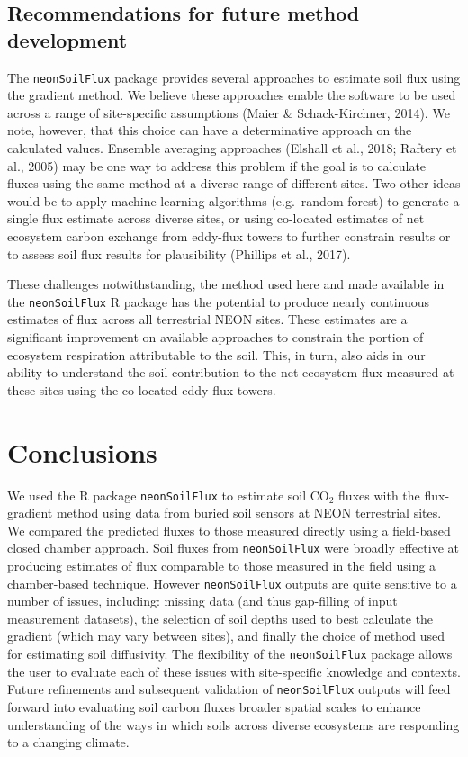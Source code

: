 \documentclass[
  letterpaper,
  DIV=11,
  numbers=noendperiod]{scrartcl}
\begin{document}
\subsection{Recommendations for future method
development}\label{recommendations-for-future-method-development}

The \texttt{neonSoilFlux} package provides several approaches to
estimate soil flux using the gradient method. We believe these
approaches enable the software to be used across a range of
site-specific assumptions (Maier \& Schack-Kirchner, 2014). We note,
however, that this choice can have a determinative approach on the
calculated values. Ensemble averaging approaches (Elshall et al., 2018;
Raftery et al., 2005) may be one way to address this problem if the goal
is to calculate fluxes using the same method at a diverse range of
different sites. Two other ideas would be to apply machine learning
algorithms (e.g.~random forest) to generate a single flux estimate
across diverse sites, or using co-located estimates of net ecosystem
carbon exchange from eddy-flux towers to further constrain results or to
assess soil flux results for plausibility (Phillips et al., 2017).

These challenges notwithstanding, the method used here and made
available in the \texttt{neonSoilFlux} R package has the potential to
produce nearly continuous estimates of flux across all terrestrial NEON
sites. These estimates are a significant improvement on available
approaches to constrain the portion of ecosystem respiration
attributable to the soil. This, in turn, also aids in our ability to
understand the soil contribution to the net ecosystem flux measured at
these sites using the co-located eddy flux towers.

\section{Conclusions}\label{conclusions}

We used the R package \texttt{neonSoilFlux} to estimate soil CO\(_2\)
fluxes with the flux-gradient method using data from buried soil sensors
at NEON terrestrial sites. We compared the predicted fluxes to those
measured directly using a field-based closed chamber approach. Soil
fluxes from \texttt{neonSoilFlux} were broadly effective at producing
estimates of flux comparable to those measured in the field using a
chamber-based technique. However \texttt{neonSoilFlux} outputs are quite
sensitive to a number of issues, including: missing data (and thus
gap-filling of input measurement datasets), the selection of soil depths
used to best calculate the gradient (which may vary between sites), and
finally the choice of method used for estimating soil diffusivity. The
flexibility of the \texttt{neonSoilFlux} package allows the user to
evaluate each of these issues with site-specific knowledge and contexts.
Future refinements and subsequent validation of \texttt{neonSoilFlux}
outputs will feed forward into evaluating soil carbon fluxes broader
spatial scales to enhance understanding of the ways in which soils
across diverse ecosystems are responding to a changing climate.
\end{document}
